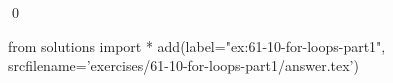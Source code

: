 
\begin{ex}
  \label{ex:61-10-for-loops-part1}
  
  \qed
\end{ex}
\begin{python0}
from solutions import *
add(label="ex:61-10-for-loops-part1",
    srcfilename='exercises/61-10-for-loops-part1/answer.tex')
\end{python0}
